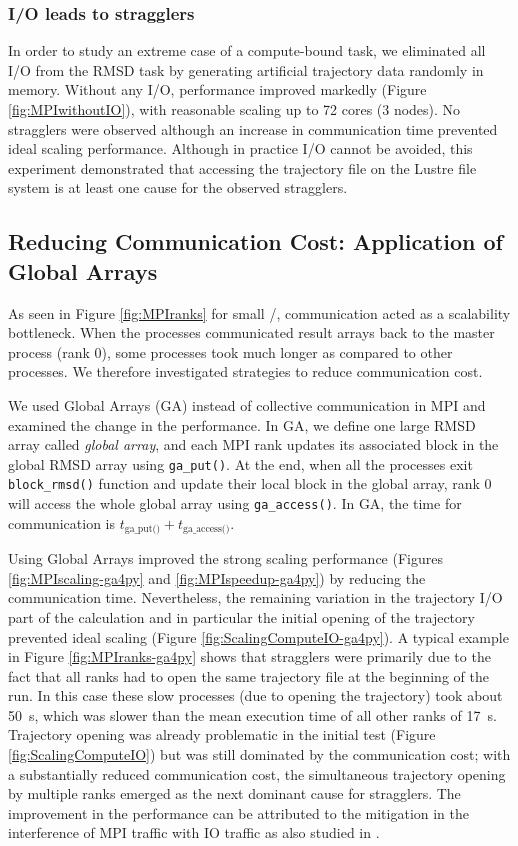 \subsubsection{I/O leads to stragglers}

In order to study an extreme case of a compute-bound task, we eliminated all I/O from the RMSD task by generating artificial trajectory data randomly in memory.
Without any I/O, performance improved markedly (Figure \ref{fig:MPIwithoutIO}), with reasonable scaling up to 72 cores (3 nodes).
No stragglers were observed although an increase in communication time prevented ideal scaling performance.
Although in practice I/O cannot be avoided, this experiment demonstrated that accessing the trajectory file on the Lustre file system is at least one cause for the observed stragglers.

\subsection{Reducing Communication Cost: Application of Global Arrays}
\label{Global-Array}
As seen in Figure \ref{fig:MPIranks} for small \tcomp/\tIO, communication acted as a scalability bottleneck. 
When the processes communicated result arrays back to the master process (rank 0), some processes took much longer as compared to other processes. 
We therefore investigated strategies to reduce communication cost. 

We used Global Arrays (GA) \cite{GA, GAiN} instead of collective communication in MPI and examined the change in the performance. 
In GA, we define one large RMSD array called \emph{global array}, and each MPI rank updates its associated block in the global RMSD array using \texttt{ga\_put()}. 
At the end, when all the processes exit \texttt{block\_rmsd()} function and update their local block in the global array, rank 0 will access the whole global array using \texttt{ga\_access()}.
In GA, the time for communication is $t_{\text{ga\_put()}}+t_{\text{ga\_access()}}$. 

Using Global Arrays improved the strong scaling performance (Figures \ref{fig:MPIscaling-ga4py} and \ref{fig:MPIspeedup-ga4py}) by reducing the communication time.
Nevertheless, the remaining variation in the trajectory I/O part of the calculation and in particular the initial opening of the trajectory prevented ideal scaling (Figure \ref{fig:ScalingComputeIO-ga4py}).
A typical example in Figure \ref{fig:MPIranks-ga4py} shows that stragglers were primarily due to the fact that all ranks had to open the same trajectory file at the beginning of the run.
In this case these slow processes (due to opening the trajectory) took about 50~s, which was slower than the mean execution time of all other ranks of 17~s. 
Trajectory opening was already problematic in the initial test (Figure \ref{fig:ScalingComputeIO}) but was still dominated by the communication cost; with a substantially reduced communication cost, the simultaneous trajectory opening by multiple ranks emerged as the next dominant cause for stragglers.
The improvement in the performance can be attributed to the mitigation in the interference of MPI traffic with IO traffic as also studied in \cite{Brown:2018ab}.

